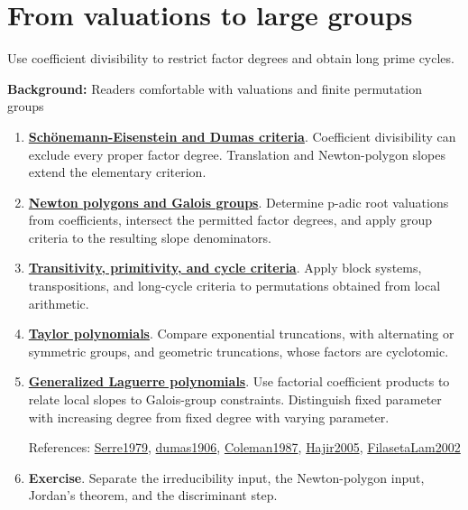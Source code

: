 \documentclass[11pt,a4paper,oneside,openany]{book}
\begin{document}
\section*{From valuations to large groups}
Use coefficient divisibility to restrict factor degrees and obtain long prime cycles.\par
\textbf{Background:} Readers comfortable with valuations and finite permutation groups\par
\begin{enumerate}
\item \textbf{\hyperlink{article:eisenstein-dumas}{Schönemann-Eisenstein and Dumas criteria}}. Coefficient divisibility can exclude every proper factor degree. Translation and Newton-polygon slopes extend the elementary criterion.\par
\item \textbf{\hyperlink{article:newton-polygons}{Newton polygons and Galois groups}}. Determine p-adic root valuations from coefficients, intersect the permitted factor degrees, and apply group criteria to the resulting slope denominators.\par
\item \textbf{\hyperlink{article:permutation-groups}{Transitivity, primitivity, and cycle criteria}}. Apply block systems, transpositions, and long-cycle criteria to permutations obtained from local arithmetic.\par
\item \textbf{\hyperlink{article:taylor}{Taylor polynomials}}. Compare exponential truncations, with alternating or symmetric groups, and geometric truncations, whose factors are cyclotomic.\par
\item \textbf{\hyperlink{article:laguerre}{Generalized Laguerre polynomials}}. Use factorial coefficient products to relate local slopes to Galois-group constraints. Distinguish fixed parameter with increasing degree from fixed degree with varying parameter.\par
{\footnotesize References: \hyperlink{ref:Serre1979}{Serre1979}, \hyperlink{ref:dumas1906}{dumas1906}, \hyperlink{ref:Coleman1987}{Coleman1987}, \hyperlink{ref:Hajir2005}{Hajir2005}, \hyperlink{ref:FilasetaLam2002}{FilasetaLam2002}}\par
\item \textbf{Exercise}. Separate the irreducibility input, the Newton-polygon input, Jordan's theorem, and the discriminant step.\par
\end{enumerate}
\end{document}
